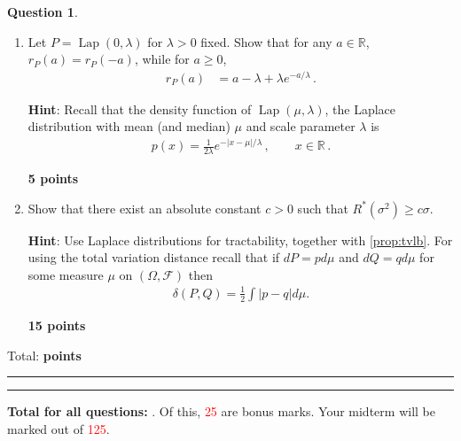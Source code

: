 \documentclass{article}
\newcommand{\R}{\mathbb{R}}
\DeclareMathOperator{\Lap}{Lap}
\DeclareMathOperator*{\1}{\mathbbm{1}}
\newcommand{\cF}{\mathcal{F}}
\newcounter{DocPoints}
\newcounter{QuestionPoints}
\newcommand{\points}[1]{	\par\mbox{}\par\noindent\hfill {\bf #1 points}	\addtocounter{DocPoints}{#1}
	\addtocounter{QuestionPoints}{#1}
}
\newcommand{\tpoints}[1]{        	\ifthenelse{\isempty{#1}}	{	}	{		\addtocounter{DocPoints}{#1}
		\addtocounter{QuestionPoints}{#1}
	}													 	\par\mbox{}\par\noindent\hfill {Total: \bf \arabic{QuestionPoints}\xspace points}\par\mbox{}\par\hrule\hrule
	\setcounter{QuestionPoints}{0}
}
\theoremstyle{definition}
\newtheorem{question}{Question}
\theoremstyle{remark}
\newcommand{\hint}{\noindent \textbf{Hint}:\xspace}
\begin{document}
\begin{question}
\begin{enumerate}[(Q1)]
\item 
Let $P = \Lap(0,\lambda)$ for $\lambda>0$ fixed.
Show that for any $a\in \R$, $r_P(a)=r_P(-a)$,
while for $a\ge 0$, 
\begin{align*}
r_P(a) 
 & = a-\lambda + \lambda e^{-a/\lambda}\,.
\end{align*}

\hint
Recall that the density function of $\Lap(\mu,\lambda)$, the Laplace distribution with mean (and median) $\mu$ and scale parameter $\lambda$ is 
\begin{align*}
p(x) = \frac{1}{2\lambda} e^{-|x-\mu|/\lambda}\,, \qquad x\in \R\,.
\end{align*}

\points{5}


\item Show that there exist an absolute constant $c>0$ such that 
$R^*(\sigma^2) \ge  c \sigma$.

\hint Use Laplace distributions for tractability, together with \cref{prop:tvlb}. For using the total variation distance recall that if $dP = p d\mu$ and $dQ = q d\mu$ for some measure $\mu$ on $(\Omega,\cF)$ then 
\begin{align}\label{eq:tvip}
\delta(P,Q) = \frac12 \int |p-q| d\mu.
\end{align}
\points{15}

\end{enumerate}
 
\tpoints{}
\end{question}





\bigskip
\bigskip

\noindent
\textbf{
Total for all questions: }.
Of this, \textcolor{red}{25} are bonus marks. 
Your midterm will be marked out of \textcolor{red}{125}.
\end{document}
